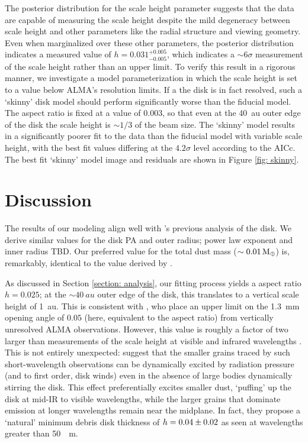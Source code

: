 \documentclass[12pt,oneside]{article}
\begin{document}
The posterior distribution for the scale height parameter suggests that the data are capable of measuring the scale height despite the mild degeneracy between scale height and other parameters like the radial structure and viewing geometry.  
Even when marginalized over these other parameters, the posterior distribution indicates a measured value of $h=0.031^{+0.005}_{-0.005}$, which indicates a $\sim 6 \sigma$ measurement of the scale height rather than an upper limit.
To verify this result in a rigorous manner, we investigate a model parameterization in which the scale height is set to a value below ALMA's resolution limits.
If a the disk is in fact resolved, such a `skinny' disk model should perform significantly worse than the fiducial model.
The aspect ratio is fixed at a value of $0.003$, so that even at the \SI{40}{au} outer edge of the disk the scale height is $\sim 1/3$ of the beam size.
The ‘skinny’ model results in a significantly poorer fit to the data than the fiducial model with variable scale height, with the best fit values differing at the $4.2\sigma$ level according to the AICc.
The best fit `skinny' model image and residuals are shown in Figure \ref{fig: skinny}.


\section{Discussion}
\label{section: discussion}
The results of our modeling align well with \cite{macgregor13}'s previous analysis of the disk. We derive similar values for the disk PA and outer radius; power law exponent and inner radius TBD. Our preferred value for the total dust mass ($\sim \SI{0.01}{M_\oplus}$) is, remarkably, identical to the value derived by \cite{matthews15}.

As discussed in Section \ref{section: analysis}, our fitting process yields a aspect ratio $h = 0.025$; at the $\sim \SI{40}{au}$ outer edge of the disk, this translates to a vertical scale height of \SI{1}{au}.
This is consistent with \cite{schuppler17}, who place an upper limit on the \SI{1.3}{mm} opening angle of $0.05$ (here, equivalent to the aspect ratio) from vertically unresolved ALMA observations. 
However, this value is roughly a factor of two larger than measurements of the scale height at visible and infrared wavelengths \citep{schneider14,krist05,metchev05}. 
This is not entirely unexpected: \cite{thebault09} suggest that the smaller grains traced by such short-wavelength observations can be dynamically excited by radiation pressure (and to first order, disk winds) even in the absence of large bodies dynamically stirring the disk. 
This effect preferentially excites smaller dust, `puffing' up the disk at mid-IR to visible wavelengths, while the larger grains that dominate emission at longer wavelengths remain near the midplane.
In fact, they propose a `natural' minimum debris disk thickness of $h = \num{0.04 \pm 0.02}$ as seen at wavelengths greater than \SI{50}{\mu \meter}.
\end{document}
